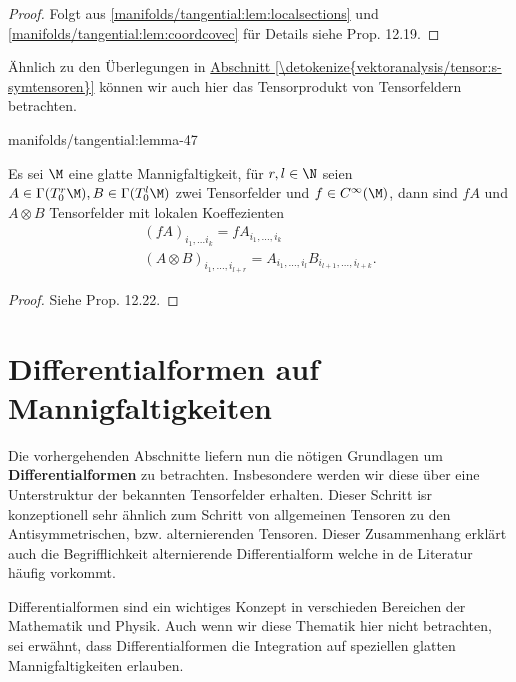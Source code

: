 \documentclass[letterpaper,10pt,german]{jupyterBook}
\begin{document}
\begin{proof}
 Folgt aus \cref{manifolds/tangential:lem:localsections} und \cref{manifolds/tangential:lem:coordcovec}   für Details siehe \cite{Lee03} Prop. 12.19.
\end{proof}

\par
Ähnlich zu den Überlegungen in \hyperref[\detokenize{vektoranalysis/tensor:s-symtensoren}]{Abschnitt \ref{\detokenize{vektoranalysis/tensor:s-symtensoren}}} können wir auch hier das Tensorprodukt von Tensorfeldern betrachten.
\begin{lemma}{}{manifolds/tangential:lemma-47}



\par
Es sei \(\M\) eine glatte Mannigfaltigkeit, für \(r,l\in \N\) seien \(A\in \Gamma(T^r_0\M), B\in \Gamma(T^l_0\M)\) zwei Tensorfelder und \(f\in C^\infty(\M)\), dann sind \(fA\) und \(A\otimes B\) Tensorfelder mit lokalen Koeffezienten
\begin{align*}
(fA)_{i_1,\ldots i_{k}} = f A_{i_1,\ldots, i_k}\\
(A\otimes B)_{i_1,\ldots,i_{l+r}} = A_{i_1,\ldots, i_l} B_{i_{l+1},\ldots, i_{l+k}}.
\end{align*}\end{lemma}

\begin{proof}
 Siehe \cite{Lee03} Prop. 12.22.
\end{proof}


\section{Differentialformen auf Mannigfaltigkeiten}
\label{\detokenize{manifolds/diffformen:differentialformen-auf-mannigfaltigkeiten}}\label{\detokenize{manifolds/diffformen::doc}}
\par
Die vorhergehenden Abschnitte liefern nun die nötigen Grundlagen um \textbf{Differentialformen} zu betrachten. Insbesondere werden wir diese über eine Unterstruktur der bekannten Tensorfelder erhalten. Dieser Schritt isr konzeptionell sehr ähnlich zum Schritt von allgemeinen Tensoren zu den Antisymmetrischen, bzw. alternierenden Tensoren. Dieser Zusammenhang erklärt auch die Begrifflichkeit alternierende Differentialform welche in de Literatur häufig vorkommt.

\par
Differentialformen sind ein wichtiges Konzept in verschieden Bereichen der Mathematik und Physik. Auch wenn wir diese Thematik hier nicht betrachten, sei erwähnt, dass Differentialformen die Integration auf speziellen glatten Mannigfaltigkeiten erlauben.
\end{document}
